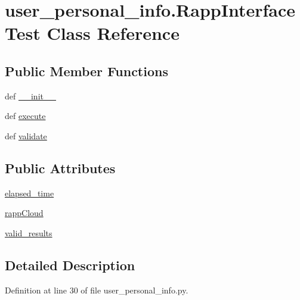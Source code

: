 \hypertarget{classuser__personal__info_1_1RappInterfaceTest}{\section{user\-\_\-personal\-\_\-info.\-Rapp\-Interface\-Test Class Reference}
\label{classuser__personal__info_1_1RappInterfaceTest}
}
\subsection*{Public Member Functions}
\begin{DoxyCompactItemize}
\item 
def \hyperlink{classuser__personal__info_1_1RappInterfaceTest_adc088b72604b7054e807448dd22c3741}{\-\_\-\-\_\-init\-\_\-\-\_\-}
\item 
def \hyperlink{classuser__personal__info_1_1RappInterfaceTest_af0483db14c71dcb98e1c1e5c65c19931}{execute}
\item 
def \hyperlink{classuser__personal__info_1_1RappInterfaceTest_aba548d2533cb8db33abf3fdc97706c27}{validate}
\end{DoxyCompactItemize}
\subsection*{Public Attributes}
\begin{DoxyCompactItemize}
\item 
\hyperlink{classuser__personal__info_1_1RappInterfaceTest_ad53868d162af327d79678b2cf623a48a}{elapsed\-\_\-time}
\item 
\hyperlink{classuser__personal__info_1_1RappInterfaceTest_af739605faa04e1c79a793a7002f0978b}{rapp\-Cloud}
\item 
\hyperlink{classuser__personal__info_1_1RappInterfaceTest_a5f0ab4a003be1b71e1606a35ad25cad7}{valid\-\_\-results}
\end{DoxyCompactItemize}


\subsection{Detailed Description}


Definition at line 30 of file user\-\_\-personal\-\_\-info.\-py.



